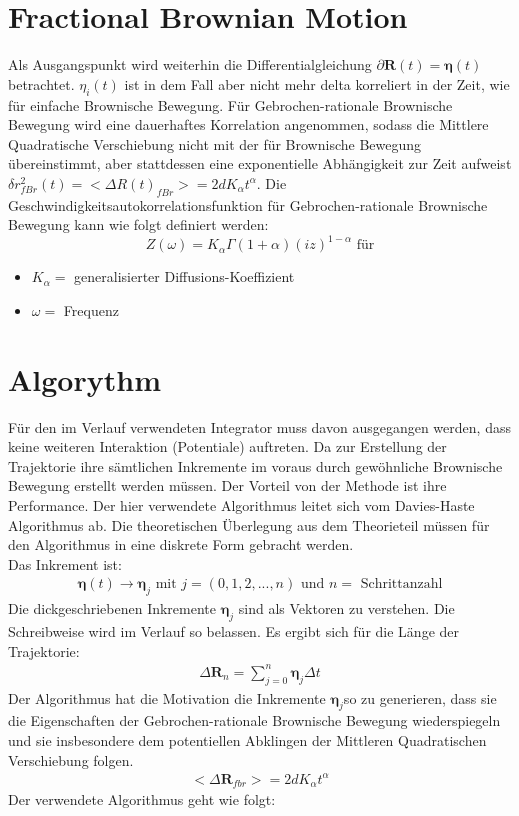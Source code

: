 \documentclass[
  a4paper,BCOR10mm,oneside,
  bibtotoc,idxtotoc,
  headsepline,footsepline,%
  fleqn,openbib
]{scrbook}
\begin{document}
\section{Fractional Brownian Motion}
Als Ausgangspunkt wird weiterhin die Differentialgleichung $\partial \boldsymbol{R}(t) = \boldsymbol{\eta}(t)$ betrachtet. $\eta_i(t)$ ist in dem Fall aber nicht mehr delta korreliert in der Zeit, wie für einfache Brownische Bewegung. Für Gebrochen-rationale Brownische Bewegung wird eine dauerhaftes Korrelation angenommen, sodass die Mittlere Quadratische Verschiebung nicht mit der für Brownische Bewegung übereinstimmt, aber stattdessen eine exponentielle Abhängigkeit zur Zeit aufweist $\delta r^{2}_{fBr}(t)= < \Delta R(t)_{fBr}>=2dK_{\alpha}t^{\alpha}$. 
Die Geschwindigkeitsautokorrelationsfunktion für Gebrochen-rationale Brownische Bewegung kann wie folgt definiert werden:
\begin{equation}
Z(\omega)= K_{\alpha} \Gamma(1+\alpha)(i z)^{1-\alpha} \text{   für} 
\end{equation}
\begin{itemize}
 \item $K_{\alpha} =$ generalisierter Diffusions-Koeffizient 
 \item $\omega = $ Frequenz 
\end{itemize}
\cite{Hofling2013}
\section{Algorythm}
Für den im Verlauf verwendeten Integrator muss davon ausgegangen werden, dass keine weiteren Interaktion (Potentiale) auftreten. Da zur Erstellung der Trajektorie ihre sämtlichen Inkremente im voraus durch gewöhnliche Brownische Bewegung erstellt werden müssen. Der Vorteil von der Methode ist ihre Performance. Der hier verwendete Algorithmus leitet sich vom Davies-Haste Algorithmus \cite{Craigmile2003} ab. Die theoretischen Überlegung aus dem Theorieteil müssen für den Algorithmus in eine diskrete Form gebracht werden. \\Das Inkrement ist:
\begin{align}
\boldsymbol{\eta} (t) \longrightarrow \boldsymbol{\eta}_j  \text{  mit  } j=(0,1,2,...,n)  \text{  und  } n= \text{ Schrittanzahl}
\end{align}
Die dickgeschriebenen Inkremente $\boldsymbol{\eta}_j$ sind als Vektoren zu verstehen. Die Schreibweise wird im Verlauf so belassen.
Es ergibt sich für die Länge der Trajektorie:
\begin{align}
 \Delta \boldsymbol{R}_n =  \sum_{j=0}^n \boldsymbol{\eta}_j  \Delta t \label{eq:diskretdeltar}
\end{align}
 Der Algorithmus hat die Motivation die Inkremente $ \boldsymbol{\eta}_j$so zu generieren, dass sie die Eigenschaften der Gebrochen-rationale Brownische Bewegung wiederspiegeln und sie insbesondere dem potentiellen Abklingen der Mittleren Quadratischen Verschiebung folgen.
\begin{align}
< \Delta \boldsymbol{R}_{fbr}>=2dK_{\alpha}t^{\alpha}
\end{align}
Der verwendete Algorithmus geht wie folgt:
 
\end{document}
